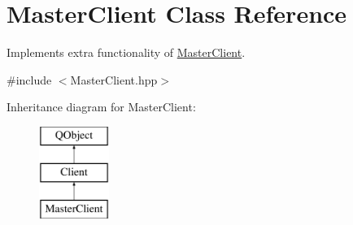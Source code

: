 \hypertarget{class_master_client}{}\section{Master\+Client Class Reference}
\label{class_master_client}


Implements extra functionality of \hyperlink{class_master_client}{Master\+Client}.  




{\ttfamily \#include $<$Master\+Client.\+hpp$>$}

Inheritance diagram for Master\+Client\+:\begin{figure}[H]
\begin{center}
\leavevmode
\includegraphics[height=3.000000cm]{class_master_client}
\end{center}
\end{figure}
